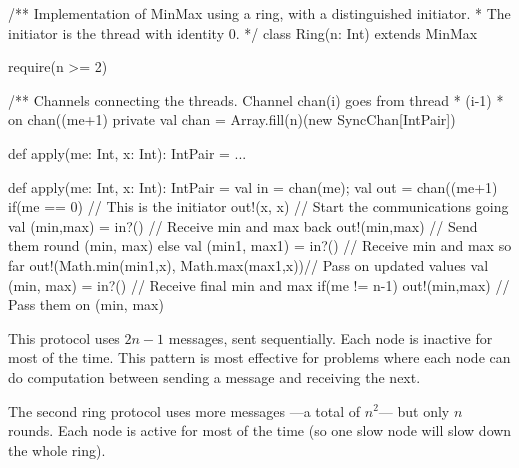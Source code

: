 \documentclass[notes,color]{sepslide0}
\begin{document}

\begin{slide}

\begin{scala}
/** Implementation of MinMax using a ring, with a distinguished initiator.
  * The initiator is the thread with identity 0. */
class Ring(n: Int) extends MinMax{
  require(n >= 2)

  /** Channels connecting the threads.  Channel chan(i) goes from thread
    * (i-1)%
    * on chan((me+1)%
  private val chan = Array.fill(n)(new SyncChan[IntPair])
 
  def apply(me: Int, x: Int): IntPair = ...
}
\end{scala}
\end{slide}


\begin{slide}

\begin{scala}
  def apply(me: Int, x: Int): IntPair = {
    val in = chan(me); val out = chan((me+1)%
    if(me == 0){              // This is the initiator
      out!(x, x)               // Start the communications going
      val (min,max) = in?()  // Receive min and max back
      out!(min,max)           // Send them round
      (min, max)
    }
    else{
      val (min1, max1) = in?()          // Receive min and max so far
      out!(Math.min(min1,x), Math.max(max1,x))// Pass on updated values
      val (min, max) = in?()             // Receive final min and max
      if(me != n-1) out!(min,max)    // Pass them on
      (min, max)
    }
  } 
\end{scala}
\end{slide}



\begin{slide}

This protocol uses $2n-1$ messages, sent sequentially.  Each node is
inactive for most of the time.  This pattern is most effective for problems
where each node can do computation between sending a message and receiving the
next. 

The second ring protocol uses more messages ---a total of $n^2$--- but only
$n$ rounds.  Each node is active for most of the time (so one slow node will
slow down the whole ring).
\end{slide}
\end{document}
